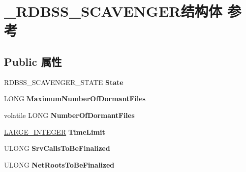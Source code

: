\hypertarget{struct___r_d_b_s_s___s_c_a_v_e_n_g_e_r}{}\section{\+\_\+\+R\+D\+B\+S\+S\+\_\+\+S\+C\+A\+V\+E\+N\+G\+E\+R结构体 参考}
\label{struct___r_d_b_s_s___s_c_a_v_e_n_g_e_r}
\subsection*{Public 属性}
\begin{DoxyCompactItemize}
\item 
\mbox{\label{struct___r_d_b_s_s___s_c_a_v_e_n_g_e_r_ad24ba5b09df7d05ce9b70556377e6934}} 
R\+D\+B\+S\+S\+\_\+\+S\+C\+A\+V\+E\+N\+G\+E\+R\+\_\+\+S\+T\+A\+TE {\bfseries State}
\item 
\mbox{\label{struct___r_d_b_s_s___s_c_a_v_e_n_g_e_r_acd20a5f7e2e9a88e2a270f4806d53913}} 
L\+O\+NG {\bfseries Maximum\+Number\+Of\+Dormant\+Files}
\item 
\mbox{\label{struct___r_d_b_s_s___s_c_a_v_e_n_g_e_r_a965ad827c9f23c6e5342d88f8fc8970b}} 
volatile L\+O\+NG {\bfseries Number\+Of\+Dormant\+Files}
\item 
\mbox{\label{struct___r_d_b_s_s___s_c_a_v_e_n_g_e_r_a5f5261a4b7fe5140ad1434288c6bfff6}} 
\hyperlink{union___l_a_r_g_e___i_n_t_e_g_e_r}{L\+A\+R\+G\+E\+\_\+\+I\+N\+T\+E\+G\+ER} {\bfseries Time\+Limit}
\item 
\mbox{\label{struct___r_d_b_s_s___s_c_a_v_e_n_g_e_r_a5e808b78f9ea24f5ae29658b1722332c}} 
U\+L\+O\+NG {\bfseries Srv\+Calls\+To\+Be\+Finalized}
\item 
\mbox{\label{struct___r_d_b_s_s___s_c_a_v_e_n_g_e_r_a17a539c35b41cde43fd749b8458dcce4}} 
U\+L\+O\+NG {\bfseries Net\+Roots\+To\+Be\+Finalized}
\item 
\mbox{\label{struct___r_d_b_s_s___s_c_a_v_e_n_g_e_r_aee83a6fc205e19b789b72601897e6b1d}} 

\end{DoxyCompactItemize}

